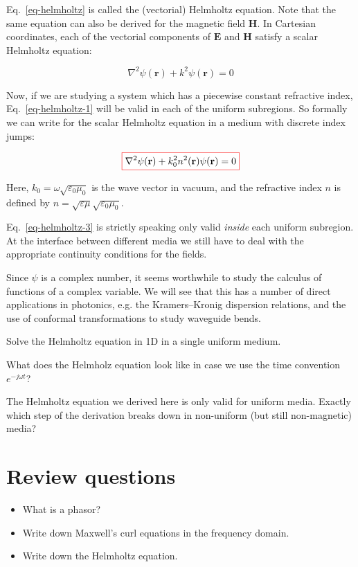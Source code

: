 Eq.~\ref{eq-helmholtz} is called the (vectorial) Helmholtz equation. Note that the same equation can also be derived for the magnetic field ${\mathbf H}$. In Cartesian coordinates, each of the vectorial components of ${\mathbf E}$ and ${\mathbf H}$ satisfy a scalar Helmholtz equation:

\begin{equation}
\nabla^2 \psi({\mathbf r}) + k^2 \psi({\mathbf r}) = 0 \label{eq-helmholtz-1}
\end{equation}

Now, if we are studying a system which has a piecewise constant refractive index, Eq.~\ref{eq-helmholtz-1} will be valid in each of the uniform subregions. So formally we can write for the scalar Helmholtz equation in a medium with discrete index jumps:

\begin{equation}
\fbox{$\displaystyle \nabla^2 \psi({\mathbf r}) + k_0^2 n^2({\mathbf r}) \psi({\mathbf r}) = 0
\label{eq-helmholtz-3}$}
\end{equation}

Here, $k_0=\omega \sqrt{\varepsilon_0 \mu_0}$ is the wave vector in vacuum, and the refractive index $n$ is defined by $n=\sqrt{\varepsilon \mu} \sqrt{\varepsilon_0 \mu_0}$.

Eq.~\ref{eq-helmholtz-3} is strictly speaking only valid \emph{inside} each uniform subregion. At the interface between different media we still have to deal with the appropriate continuity conditions for the fields.

Since $\psi$ is a complex number, it seems worthwhile to study the calculus of functions of a complex variable. We will see that this has a number of direct applications in photonics, e.g. the Kramers--Kronig dispersion relations, and the use of conformal transformations to study waveguide bends.

\begin{exer}
Solve the Helmholtz equation in 1D in a single uniform medium.
\end{exer}

\begin{exer}
What does the Helmholz equation look like in case we use the time convention  $e^{-j \omega t}$? 
\end{exer}

\begin{exer}
The Helmholtz equation we derived here is only valid for uniform media. Exactly which step of the derivation breaks down in non-uniform (but still non-magnetic) media?
\end{exer}

\section*{Review questions}

\begin{itemize}
\item What is a phasor?
\item Write down Maxwell's curl equations in the frequency domain.
\item Write down the Helmholtz equation.
\end{itemize}



